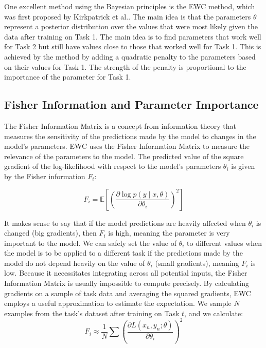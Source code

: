 \documentclass[english, LaM, oneside]{sapthesis}%
\numberwithin{equation}{chapter}
\begin{document}
One excellent method using the Bayesian principles is the EWC method, which was first proposed by Kirkpatrick et al.\cite{2}. The main idea is that the parameters $\theta$ represent a posterior distribution over the values that were most likely given the data after training on Task 1. The main idea is to find parameters that work well for Task 2 but still have values close to those that worked well for Task 1. This is achieved by the method by adding a quadratic penalty to the parameters based on their values for Task 1. The strength of the penalty is proportional to the importance of the parameter for Task 1.

\subsection{Fisher Information and Parameter Importance}
The Fisher Information Matrix is a concept from information theory that measures the sensitivity of the predictions made by the model to changes in the model's parameters. EWC uses the Fisher Information Matrix to measure the relevance of the parameters to the model\cite{2}. The predicted value of the square gradient of the log-likelihood with respect to the model's parameters $\theta_i$ is given by the Fisher information $F_i$:

\begin{equation}
    F_i = \mathbb{E} \left[ \left( \frac{\partial \log p(y \mid x, \theta)}{\partial \theta_i} \right)^2 \right]
\end{equation}

It makes sense to say that if the model predictions are heavily affected when $\theta_i$ is changed (big gradients), then $F_i$ is high, meaning the parameter is very important to the model. We can safely set the value of $\theta_i$ to different values when the model is to be applied to a different task if the predictions made by the model do not depend heavily on the value of $\theta_i$ (small gradients), meaning $F_i$ is low.
Because it necessitates integrating across all potential inputs, the Fisher Information Matrix is usually impossible to compute precisely. By calculating gradients on a sample of task data and averaging the squared gradients, EWC employs a useful approximation to estimate the expectation. We sample $N$ examples from the task's dataset after training on Task $t$, and we calculate:
\begin{equation}
    F_i \approx \frac{1}{N} \sum \left( \frac{\partial L(x_n, y_n; \theta)}{\partial \theta_i} \right)^2
\end{equation}
\end{document}
